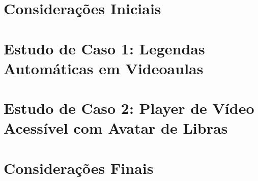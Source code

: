\section{Considerações Iniciais}

\section{Estudo de Caso 1: Legendas Automáticas em Videoaulas}

\section{Estudo de Caso 2: Player de Vídeo Acessível com Avatar de Libras}

\section{Considerações Finais}